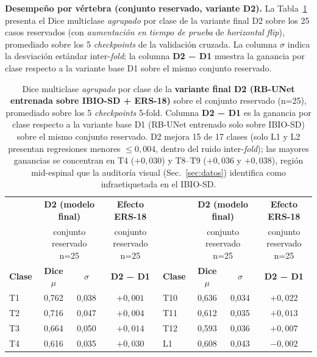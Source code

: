 \documentclass[conference]{IEEEtran}
\begin{document}
\textbf{Desempeño por vértebra (conjunto reservado, variante D2).} La Tabla~\ref{tab:perclass} presenta el Dice multiclase \emph{agrupado} por clase de la variante final D2 sobre los 25 casos reservados (con \emph{aumentación en tiempo de prueba} de \emph{horizontal flip}), promediado sobre los 5 \emph{checkpoints} de la validación cruzada. La columna $\sigma$ indica la desviación estándar inter-\emph{fold}; la columna \textbf{D2 − D1} muestra la ganancia por clase respecto a la variante base D1 sobre el mismo conjunto reservado.

\begin{table}[htbp]
\caption{Dice multiclase \emph{agrupado} por clase de la \textbf{variante final D2 (RB-UNet entrenada sobre IBIO-SD + ERS-18)} sobre el conjunto reservado (n=25), promediado sobre los 5 \emph{checkpoints} 5-fold. Columna \textbf{D2 − D1} es la ganancia por clase respecto a la variante base D1 (RB-UNet entrenado solo sobre IBIO-SD) sobre el mismo conjunto reservado. D2 mejora 15 de 17 clases (solo L1 y L2 presentan regresiones menores $\leq 0{,}004$, dentro del ruido inter-\emph{fold}); las mayores ganancias se concentran en T4 ($+0{,}030$) y T8--T9 ($+0{,}036$ y $+0{,}038$), región mid-espinal que la auditoría visual (Sec.~\ref{sec:datos}) identifica como infraetiquetada en el IBIO-SD.}
\label{tab:perclass}
\begin{center}
\renewcommand{\arraystretch}{1.15}
\begin{tabular}{@{}lccc|lccc@{}}
\toprule
 & \multicolumn{2}{c}{\textbf{D2 (modelo final)}} & \textbf{Efecto ERS-18} & & \multicolumn{2}{c}{\textbf{D2 (modelo final)}} & \textbf{Efecto ERS-18} \\
 & \multicolumn{2}{c}{\scriptsize conjunto reservado n=25} & \scriptsize conjunto reservado n=25 & & \multicolumn{2}{c}{\scriptsize conjunto reservado n=25} & \scriptsize conjunto reservado n=25 \\
\textbf{Clase} & \textbf{Dice $\mu$} & \textbf{$\sigma$} & \textbf{D2 − D1} & \textbf{Clase} & \textbf{Dice $\mu$} & \textbf{$\sigma$} & \textbf{D2 − D1} \\
\midrule
T1  & 0{,}762 & 0{,}038 & $+0{,}001$ & T10           & 0{,}636      & 0{,}034      & $+0{,}022$ \\
T2  & 0{,}716 & 0{,}047 & $+0{,}004$ & T11           & 0{,}612      & 0{,}035      & $+0{,}013$ \\
T3  & 0{,}664 & 0{,}050 & $+0{,}014$ & T12           & 0{,}593      & 0{,}036      & $+0{,}007$ \\
T4  & 0{,}616 & 0{,}035 & $+0{,}030$ & L1            & 0{,}608      & 0{,}043      & $-0{,}002$ \\

\end{tabular}
\end{center}
\end{table}
\end{document}
